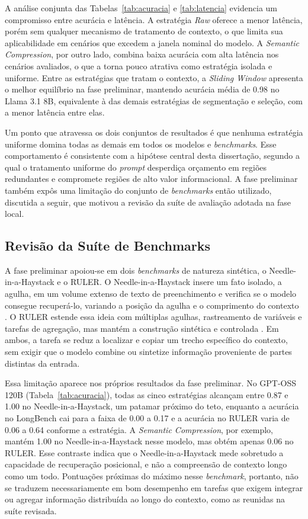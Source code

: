 A análise conjunta das Tabelas~\ref{tab:acuracia} e \ref{tab:latencia} evidencia um compromisso entre acurácia e latência. A estratégia \textit{Raw} oferece a menor latência, porém sem qualquer mecanismo de tratamento de contexto, o que limita sua aplicabilidade em cenários que excedem a janela nominal do modelo. A \textit{Semantic Compression}, por outro lado, combina baixa acurácia com alta latência nos cenários avaliados, o que a torna pouco atrativa como estratégia isolada e uniforme. Entre as estratégias que tratam o contexto, a \textit{Sliding Window} apresenta o melhor equilíbrio na fase preliminar, mantendo acurácia média de 0.98 no Llama 3.1 8B, equivalente à das demais estratégias de segmentação e seleção, com a menor latência entre elas.

Um ponto que atravessa os dois conjuntos de resultados é que nenhuma estratégia uniforme domina todas as demais em todos os modelos e \textit{benchmarks}. Esse comportamento é consistente com a hipótese central desta dissertação, segundo a qual o tratamento uniforme do \textit{prompt} desperdiça orçamento em regiões redundantes e compromete regiões de alto valor informacional. A fase preliminar também expôs uma limitação do conjunto de \textit{benchmarks} então utilizado, discutida a seguir, que motivou a revisão da suíte de avaliação adotada na fase local.

\subsection{Revisão da Suíte de Benchmarks}
\label{subsec:revisao-benchmarks}

A fase preliminar apoiou-se em dois \textit{benchmarks} de natureza sintética, o Needle-in-a-Haystack e o RULER. O Needle-in-a-Haystack insere um fato isolado, a agulha, em um volume extenso de texto de preenchimento e verifica se o modelo consegue recuperá-lo, variando a posição da agulha e o comprimento do contexto \cite{kamradt2023needle}. O RULER estende essa ideia com múltiplas agulhas, rastreamento de variáveis e tarefas de agregação, mas mantém a construção sintética e controlada \cite{hsieh2024ruler}. Em ambos, a tarefa se reduz a localizar e copiar um trecho específico do contexto, sem exigir que o modelo combine ou sintetize informação proveniente de partes distintas da entrada.

Essa limitação aparece nos próprios resultados da fase preliminar. No GPT-OSS 120B (Tabela~\ref{tab:acuracia}), todas as cinco estratégias alcançam entre 0.87 e 1.00 no Needle-in-a-Haystack, um patamar próximo do teto, enquanto a acurácia no LongBench cai para a faixa de 0.00 a 0.17 e a acurácia no RULER varia de 0.06 a 0.64 conforme a estratégia. A \textit{Semantic Compression}, por exemplo, mantém 1.00 no Needle-in-a-Haystack nesse modelo, mas obtém apenas 0.06 no RULER. Esse contraste indica que o Needle-in-a-Haystack mede sobretudo a capacidade de recuperação posicional, e não a compreensão de contexto longo como um todo. Pontuações próximas do máximo nesse \textit{benchmark}, portanto, não se traduzem necessariamente em bom desempenho em tarefas que exigem integrar ou agregar informação distribuída ao longo do contexto, como as reunidas na suíte revisada.

